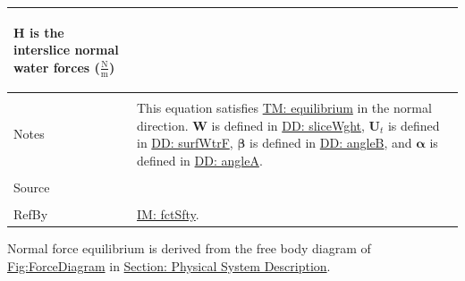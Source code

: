 \documentclass[12pt]{article}
\begin{document}
\begin{minipage}{\textwidth}
\begin{tabular}{p{} p{}}
\begin{symbDescription}
              \item{$\mathbf{H}$ is the interslice normal water forces ($\frac{\text{N}}{\text{m}}$)}
              \end{symbDescription}
\\ \midrule \\
Notes & This equation satisfies \hyperref[TM:equilibrium]{TM: equilibrium} in the normal direction. $\mathbf{W}$ is defined in \hyperref[DD:sliceWght]{DD: sliceWght}, ${\mathbf{U}_{t}}$ is defined in \hyperref[DD:surfWtrF]{DD: surfWtrF}, $\mathbf{β}$ is defined in \hyperref[DD:angleB]{DD: angleB}, and $\mathbf{α}$ is defined in \hyperref[DD:angleA]{DD: angleA}.
\\ \midrule \\
Source & \cite{chen2005}
\\ \midrule \\
RefBy & \hyperref[IM:fctSfty]{IM: fctSfty}.
\\ \bottomrule \end{tabular}
\end{minipage}
Normal force equilibrium is derived from the free body diagram of \hyperref[Figure:ForceDiagram]{Fig:ForceDiagram} in \hyperref[Sec:PhysSyst]{Section: Physical System Description}.
\par~
\end{document}
